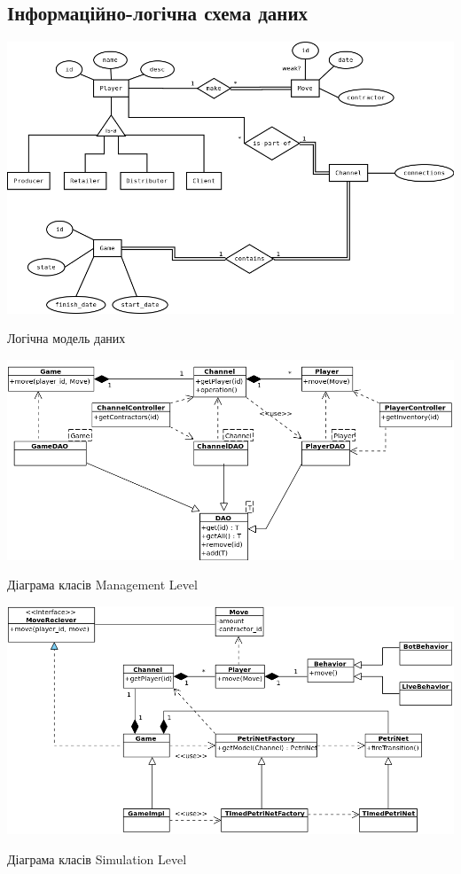 ﻿
\subsection{Інформаційно-логічна схема даних}
\begin{stdfigure}
    \includegraphics[width=7in]{images/er.png}
    \caption{Логічна модель даних}
    \label{fig:er}
\end{stdfigure}   
\begin{stdfigure}
    \includegraphics[width=7in]{images/uml/management_level.png}
    \caption{Діаграма класів Management Level}
    \label{fig:uml_management}
\end{stdfigure}   

\begin{stdfigure}
    \includegraphics[width=7in]{images/uml/simulation_level.png}
    \caption{Діаграма класів Simulation Level}
    \label{fig:uml_simulation}
\end{stdfigure}   

